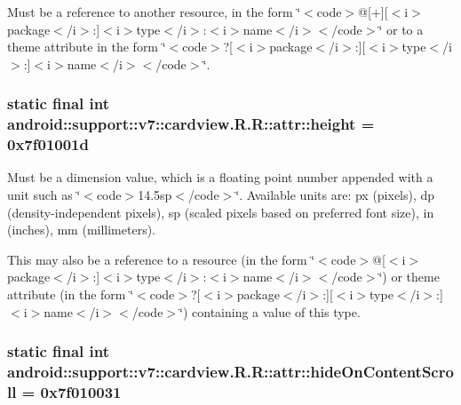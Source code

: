 Must be a reference to another resource, in the form \char`\"{}$<$code$>$@\mbox{[}+\mbox{]}\mbox{[}$<$i$>$package$<$/i$>$:\mbox{]}$<$i$>$type$<$/i$>$:$<$i$>$name$<$/i$>$$<$/code$>$\char`\"{} or to a theme attribute in the form \char`\"{}$<$code$>$?\mbox{[}$<$i$>$package$<$/i$>$:\mbox{]}\mbox{[}$<$i$>$type$<$/i$>$:\mbox{]}$<$i$>$name$<$/i$>$$<$/code$>$\char`\"{}. \hypertarget{classandroid_1_1support_1_1v7_1_1cardview_1_1_r_1_1attr_7aef737b4ba0d5908354dcf71deb69bb}{
\subsubsection[{height}]{\setlength{\rightskip}{0pt plus 5cm}static final int android::support::v7::cardview.R.R::attr::height = 0x7f01001d}}
\label{classandroid_1_1support_1_1v7_1_1cardview_1_1_r_1_1attr_7aef737b4ba0d5908354dcf71deb69bb}


Must be a dimension value, which is a floating point number appended with a unit such as \char`\"{}$<$code$>$14.5sp$<$/code$>$\char`\"{}. Available units are: px (pixels), dp (density-independent pixels), sp (scaled pixels based on preferred font size), in (inches), mm (millimeters). 

This may also be a reference to a resource (in the form \char`\"{}$<$code$>$@\mbox{[}$<$i$>$package$<$/i$>$:\mbox{]}$<$i$>$type$<$/i$>$:$<$i$>$name$<$/i$>$$<$/code$>$\char`\"{}) or theme attribute (in the form \char`\"{}$<$code$>$?\mbox{[}$<$i$>$package$<$/i$>$:\mbox{]}\mbox{[}$<$i$>$type$<$/i$>$:\mbox{]}$<$i$>$name$<$/i$>$$<$/code$>$\char`\"{}) containing a value of this type. \hypertarget{classandroid_1_1support_1_1v7_1_1cardview_1_1_r_1_1attr_de9b4c23961d3e8094ac7a6f9a49d5b2}{
\subsubsection[{hideOnContentScroll}]{\setlength{\rightskip}{0pt plus 5cm}static final int android::support::v7::cardview.R.R::attr::hideOnContentScroll = 0x7f010031}}
\label{classandroid_1_1support_1_1v7_1_1cardview_1_1_r_1_1attr_de9b4c23961d3e8094ac7a6f9a49d5b2}


